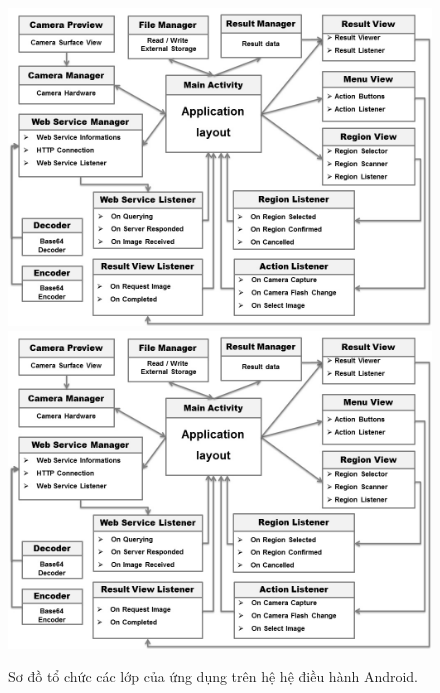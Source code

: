 \begin{figure}[!htbp]
  \begin{center}
    \leavevmode
    \ifpdf
      \includegraphics[scale=0.19]{client_model}
    \else
      \includegraphics[scale=0.19]{client_model}
    \fi
    \caption[Sơ đồ tổ chức các lớp của ứng dụng trên hệ hệ điều hành Android.]{Sơ đồ tổ chức các lớp của ứng dụng trên hệ hệ điều hành Android.}
    \label{FigClientFramework}
  \end{center}
\end{figure}

